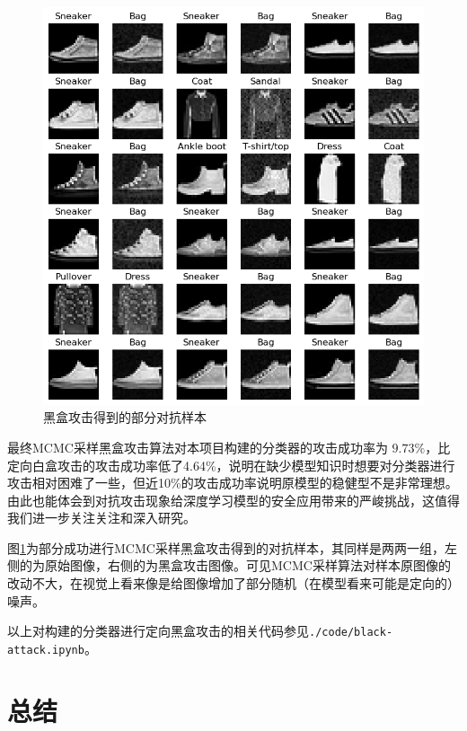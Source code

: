 \documentclass[journal, a4paper]{IEEEtran}
\begin{document}
\begin{figure}[!t]
    \centering
        \includegraphics[width=\columnwidth]{../img/black-attack-sample4.png}
    \caption{黑盒攻击得到的部分对抗样本}\label{figure:Black-Attack-Sample}
\end{figure}

最终MCMC采样黑盒攻击算法对本项目构建的分类器的攻击成功率为 $9.73\%$，比定向白盒攻击的攻击成功率低了4.64\%，说明在缺少模型知识时想要对分类器进行攻击相对困难了一些，但近10\%的攻击成功率说明原模型的稳健型不是非常理想。由此也能体会到对抗攻击现象给深度学习模型的安全应用带来的严峻挑战，这值得我们进一步关注关注和深入研究。

图\ref{figure:Black-Attack-Sample}为部分成功进行MCMC采样黑盒攻击得到的对抗样本，其同样是两两一组，左侧的为原始图像，右侧的为黑盒攻击图像。可见MCMC采样算法对样本原图像的改动不大，在视觉上看来像是给图像增加了部分随机（在模型看来可能是定向的）噪声。

以上对构建的分类器进行定向黑盒攻击的相关代码参见\verb|./code/black-attack.ipynb|。

\section{\textbf{总结}}
\end{document}
